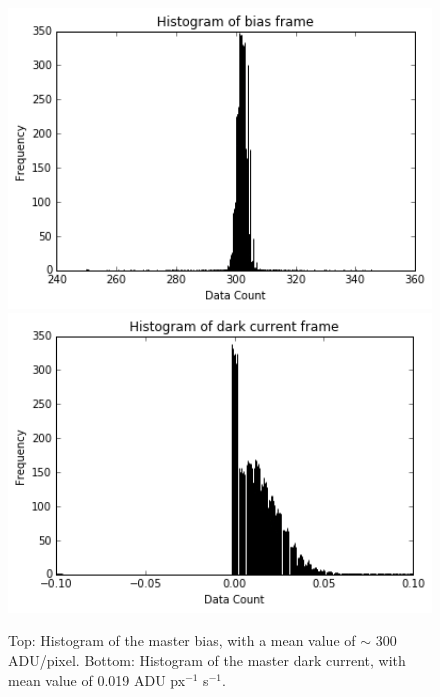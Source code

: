 \documentclass[crop=false,class=mitthesis,oneside,font=12pt]{standalone}
\begin{document}
\begin{figure}[H]
	\centering\includegraphics[width=30pc]{bias.png}
    \centering\includegraphics[width=30pc]{dark.png}
	\caption{Top: Histogram of the master bias, with a mean value of $\sim$ 300 ADU/pixel.  Bottom: Histogram of the master dark current, with mean value of 0.019 ADU px$^{-1}$ s$^{-1}$.}
	\label{fig:biasdark}
\end{figure}
\end{document}

